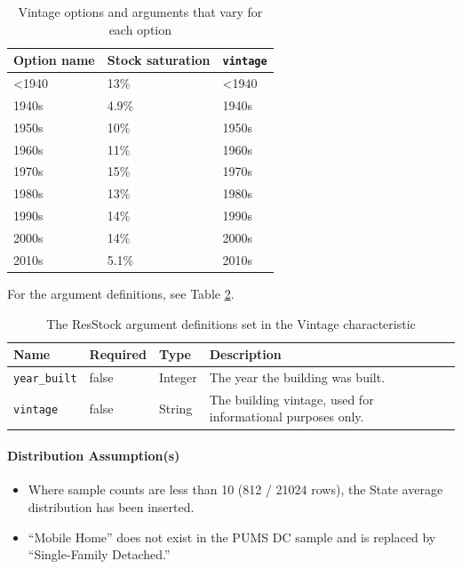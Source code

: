 \begin{longtable}[]{ |p{}|p{3cm}|p{3cm}| }
\caption{Vintage options and arguments that vary for each option} \label{table:hc_opt_vintage} \\
\toprule\noalign{}
Option name & Stock saturation &
\texttt{vintage} \\
\midrule\noalign{}
\endhead
\bottomrule\noalign{}
\endlastfoot
\textless1940 & 13\% & \textless1940 \\
1940s & 4.9\% & 1940s \\
1950s & 10\% & 1950s \\
1960s & 11\% & 1960s \\
1970s & 15\% & 1970s \\
1980s & 13\% & 1980s \\
1990s & 14\% & 1990s \\
2000s & 14\% & 2000s \\
2010s & 5.1\% & 2010s \\
\end{longtable}

For the argument definitions, see Table \ref{table:hc_arg_def_vintage}.

\begin{longtable}[]{ |p{}|p{1.5cm}|p{1.1cm}|p{6cm}| }
\caption{The ResStock argument definitions set in the Vintage characteristic} \label{table:hc_arg_def_vintage}  \\
\toprule\noalign{}
Name & Required & Type & Description \\
\midrule\noalign{}
\endhead
\bottomrule\noalign{}
\endlastfoot
\texttt{year\_built} & false & Integer & The year the building was
built. \\
\hline
\texttt{vintage} & false & String & The building vintage, used for
informational purposes only. \\
\end{longtable}

\paragraph{Distribution Assumption(s)}
\begin{itemize}
    \item Where sample counts are less than 10 (812 / 21024 rows), the State average distribution has been inserted. 
    \item ``Mobile Home'' does not exist in the PUMS DC sample and is replaced by ``Single-Family Detached.''
\end{itemize}

